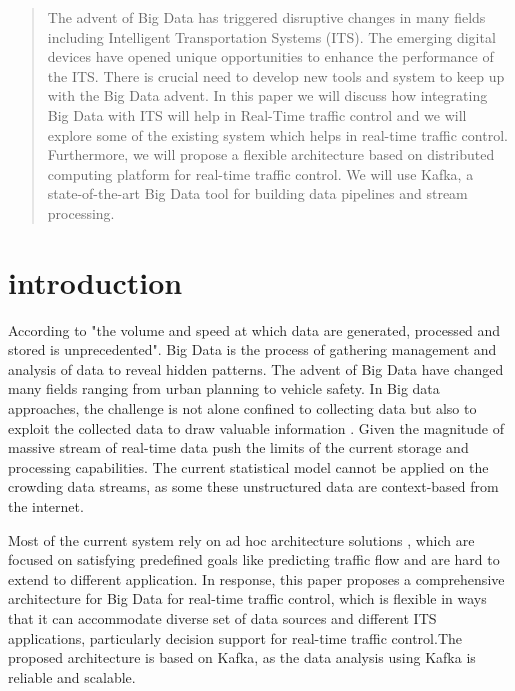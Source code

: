\documentclass[sigconf]{acmart}
\begin{document}
\begin{abstract}
The advent of Big Data has triggered disruptive
changes in many fields including Intelligent Transportation
Systems (ITS). The emerging digital devices have opened unique opportunities  to enhance the performance of the ITS. There is crucial need to develop new tools and system to keep up with the Big Data advent. In this paper we will discuss how integrating Big Data with ITS will help in Real-Time traffic control and we will explore some of the existing system which helps in real-time traffic control. Furthermore, we will propose a flexible architecture based on distributed computing platform for real-time traffic control. We will use Kafka, a state-of-the-art Big
Data tool for building data pipelines and stream processing.
\end{abstract}




\maketitle

\section{introduction}

According to \cite{wwwbigdata} "the volume and speed at which data are generated, processed and stored is unprecedented". Big Data is the process of gathering management and analysis of data to reveal hidden patterns. The advent of Big Data have changed many fields ranging from urban planning to vehicle safety. In Big data approaches, the challenge is not alone confined to collecting data but also to exploit the collected data to draw valuable information . Given the magnitude of massive stream of real-time data push the limits of the current storage and processing capabilities. The current statistical model cannot be applied on the crowding data streams, as some these unstructured data \cite{unstruct} are context-based from the internet.

Most of the current system rely on ad hoc architecture solutions \cite{mapreduce} \cite{infomin}, which are focused on satisfying predefined goals like predicting traffic flow and are hard to extend to different application. In response, this paper proposes a comprehensive architecture for Big Data for real-time traffic control, which is flexible in ways that it can accommodate diverse set of data sources and different ITS applications, particularly decision support for real-time traffic control.The proposed architecture is based on Kafka, as the data analysis using Kafka is reliable and scalable.
\end{document}
